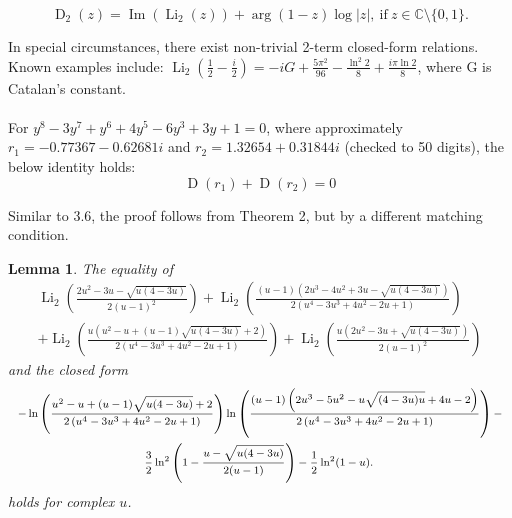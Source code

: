 \documentclass[12pt]{article}
\newtheorem{lemma}{Lemma}%
\begin{document}
\begin{equation}
\operatorname{D}_2 (z) = \operatorname{Im} (\operatorname{Li}_2 (z) )+\arg(1-z)\log|z| , \ \text{if}  \ z \in \mathbb{C} \setminus \{0, 1\}.
\end{equation}

\noindent In special circumstances, there exist non-trivial 2-term closed-form relations. Known examples include:
$\operatorname{Li}_2\left(\frac{1}{2} - \frac{i}{2}\right) = -i G + \frac{5\pi^2}{96} - \frac{\ln^2 2}{8} + \frac{i \pi \ln 2}{8}$, where G is Catalan's constant. 
\\
\\
\noindent For  $y^8 - 3 y^7 + y^6 + 4 y^5 - 6 y^3 + 3 y + 1=0$, where approximately  $r_1=-0.77367 - 0.62681 i$ and $r_2=1.32654 + 0.31844 i$ (checked to 50 digits), the below identity holds:
\begin{equation}
\operatorname{D}(r_1)+\operatorname{D}(r_2)=0
\end{equation}

\noindent Similar to 3.6, the proof follows from Theorem  2, but by a different matching condition. 

\begin{lemma}\label{previously10p2b}
 The equality of 
\begin{multline*}
 \operatorname{Li}_2 \left( \frac{2 u^2 - 3 u - \sqrt{u(4-3u)}}{2 (u-1)^2} \right) 
 + \operatorname{Li}_2 \left( \frac{(u - 1) \left(2 u^3 - 4 u^2 + 3 u - \sqrt{u(4 - 
 3 u)} \right)}{2 \left(u^4 - 3 u^3 + 4 u^2 - 2 u + 1\right)} \right) \\ 
 + \operatorname{Li}_2 \left( \frac{u \left( u^2 - u + (u - 1) \sqrt{u(4-3u)} + 
 2 \right)}{2 \left(u^4 - 3 u^3 + 4 u^2 - 2 u + 1\right)} \right) 
 + \operatorname{Li}_2 \left( \frac{u \left(2 u^2 - 3 u + \sqrt{u(4-3u)}\right)}{2 (u-1)^2} \right) 
\end{multline*}
 and the closed form 
\begin{multline*}
 \text{ { \footnotesize $ - \ln \left( \frac{u^2 - u + (u - 
 1) \sqrt{u(4 - 3 u)} + 2}{2 \left(u^4 - 3 u^3 + 4 u^2 - 2 u + 1\right)} \right) 
 \ln \left( \frac{(u - 1) \left(2 u^3 - 5 u^2 - u \sqrt{(4 - 3 u) u} + 4 u - 2\right)}{2 \left(u^4 - 3 u^3 + 
 4 u^2 - 2 u + 1\right)} \right) - $ } } \\ 
 \text{ { \footnotesize $ \frac{3}{2} \ln^2 \left( 1 - \frac{u - \sqrt{u(4-3u)}}{2(u-1)} \right) - 
 \frac{1}{2} \ln^2 (1 - u)$. } }
\end{multline*}
 holds for complex $u$. 
\end{lemma}
\end{document}
